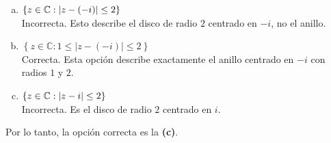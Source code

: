 \begin{prob}
\begin{myproof}
\begin{enumerate}[(a)]
\item $\left\lbrace z\in \mathbb{C}:  \left\vert z-(-i)\right\vert\leq 2 \right\rbrace$\\
Incorrecta. Esto describe el disco de radio $2$ centrado en $-i$, no el anillo.

\item $\left\lbrace z\in\mathbb{C}:1\leq|z-(-i)|\leq 2\right\rbrace$\\
Correcta. Esta opción describe exactamente el anillo centrado en $-i$ con radios $1$ y $2$.

\item $\left\lbrace z\in \mathbb{C}:  \left\vert z-i\right\vert\leq 2 \right\rbrace$\\
Incorrecta. Es el disco de radio $2$ centrado en $i$.
\end{enumerate}

Por lo tanto, la opción correcta es la \textbf{(c)}.
\end{myproof}

\end{prob}

